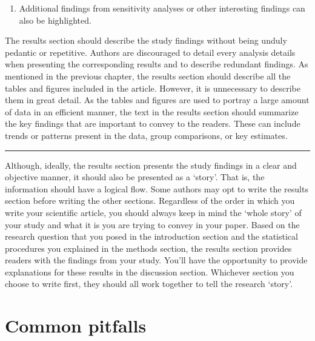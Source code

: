\documentclass[
]{book}
\providecommand{\tightlist}{%
  \setlength{\itemsep}{0pt}\setlength{\parskip}{0pt}}
\begin{document}
\begin{enumerate}
  \begin{enumerate}
  \def\labelenumii{\alph{enumii}.}
  \tightlist
  \item
    Additional findings from sensitivity analyses or other interesting findings can also be highlighted.
  \end{enumerate}
\end{enumerate}

The results section should describe the study findings without being unduly pedantic or repetitive. Authors are discouraged to detail every analysis details when presenting the corresponding results and to describe redundant findings. As mentioned in the previous chapter, the results section should describe all the tables and figures included in the article. However, it is unnecessary to describe them in great detail. As the tables and figures are used to portray a large amount of data in an efficient manner, the text in the results section should summarize the key findings that are important to convey to the readers. These can include trends or patterns present in the data, group comparisons, or key estimates.

\begin{center}\rule{0.5\linewidth}{0.5pt}\end{center}

Although, ideally, the results section presents the study findings in a clear and objective manner, it should also be presented as a `story'. That is, the information should have a logical flow. Some authors may opt to write the results section before writing the other sections. Regardless of the order in which you write your scientific article, you should always keep in mind the `whole story' of your study and what it is you are trying to convey in your paper. Based on the research question that you posed in the introduction section and the statistical procedures you explained in the methods section, the results section provides readers with the findings from your study. You'll have the opportunity to provide explanations for these results in the discussion section. Whichever section you choose to write first, they should all work together to tell the research `story'.

\hypertarget{common-pitfalls-3}{%
\section{Common pitfalls}\label{common-pitfalls-3}}
\end{document}
